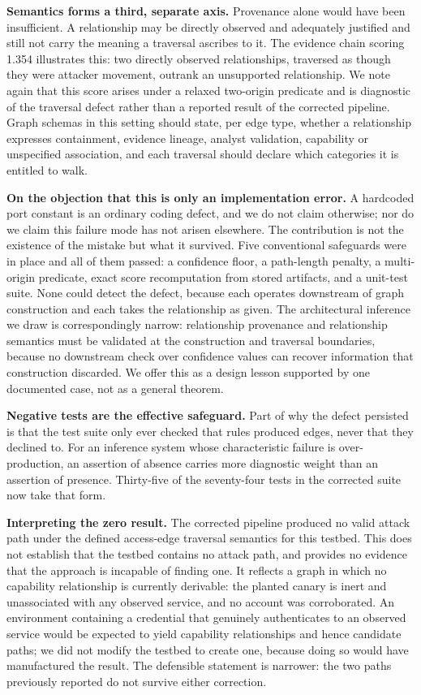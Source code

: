 \documentclass[11pt,a4paper]{article}
\begin{document}
\textbf{Semantics forms a third, separate axis.} Provenance alone would have been insufficient. A relationship may be directly observed and adequately justified and still not carry the meaning a traversal ascribes to it. The evidence chain scoring 1.354 illustrates this: two directly observed relationships, traversed as though they were attacker movement, outrank an unsupported relationship. We note again that this score arises under a relaxed two-origin predicate and is diagnostic of the traversal defect rather than a reported result of the corrected pipeline. Graph schemas in this setting should state, per edge type, whether a relationship expresses containment, evidence lineage, analyst validation, capability or unspecified association, and each traversal should declare which categories it is entitled to walk.

\textbf{On the objection that this is only an implementation error.} A hardcoded port constant is an ordinary coding defect, and we do not claim otherwise; nor do we claim this failure mode has not arisen elsewhere. The contribution is not the existence of the mistake but what it survived. Five conventional safeguards were in place and all of them passed: a confidence floor, a path-length penalty, a multi-origin predicate, exact score recomputation from stored artifacts, and a unit-test suite. None could detect the defect, because each operates downstream of graph construction and each takes the relationship as given. The architectural inference we draw is correspondingly narrow: relationship provenance and relationship semantics must be validated at the construction and traversal boundaries, because no downstream check over confidence values can recover information that construction discarded. We offer this as a design lesson supported by one documented case, not as a general theorem.

\textbf{Negative tests are the effective safeguard.} Part of why the defect persisted is that the test suite only ever checked that rules produced edges, never that they declined to. For an inference system whose characteristic failure is over-production, an assertion of absence carries more diagnostic weight than an assertion of presence. Thirty-five of the seventy-four tests in the corrected suite now take that form.

\textbf{Interpreting the zero result.} The corrected pipeline produced no valid attack path under the defined access-edge traversal semantics for this testbed. This does not establish that the testbed contains no attack path, and provides no evidence that the approach is incapable of finding one. It reflects a graph in which no capability relationship is currently derivable: the planted canary is inert and unassociated with any observed service, and no account was corroborated. An environment containing a credential that genuinely authenticates to an observed service would be expected to yield capability relationships and hence candidate paths; we did not modify the testbed to create one, because doing so would have manufactured the result. The defensible statement is narrower: the two paths previously reported do not survive either correction.
\end{document}
